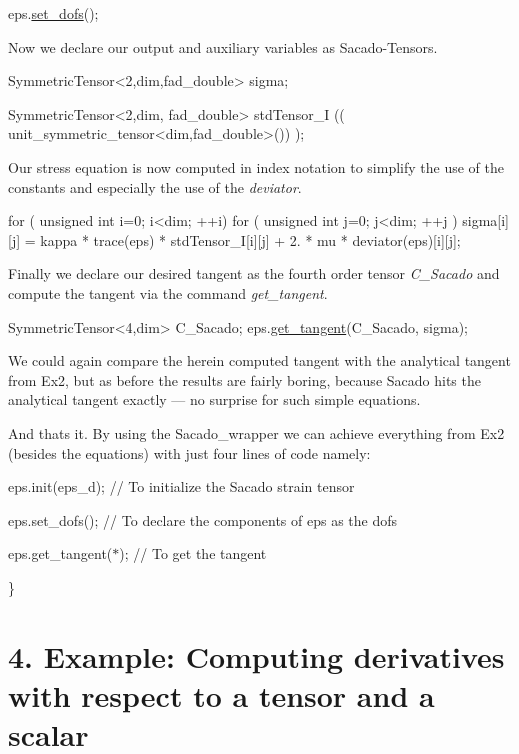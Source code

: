 \begin{DoxyCode}
eps.\hyperlink{classSacado__Wrapper_1_1SymTensor_aa9e0fcc9d4e0a4120bedb8ef9b8d7ecb}{set\_dofs}();
\end{DoxyCode}
 Now we declare our output and auxiliary variables as Sacado-\/\+Tensors. 
\begin{DoxyCode}
SymmetricTensor<2,dim,fad\_double> sigma;

SymmetricTensor<2,dim, fad\_double> stdTensor\_I (( unit\_symmetric\_tensor<dim,fad\_double>()) );
\end{DoxyCode}
 Our stress equation is now computed in index notation to simplify the use of the constants and especially the use of the {\itshape deviator}. 
\begin{DoxyCode}
\textcolor{keywordflow}{for} ( \textcolor{keywordtype}{unsigned} \textcolor{keywordtype}{int} i=0; i<dim; ++i)
  \textcolor{keywordflow}{for} ( \textcolor{keywordtype}{unsigned} \textcolor{keywordtype}{int} j=0; j<dim; ++j )
      sigma[i][j] = kappa * trace(eps) *  stdTensor\_I[i][j] + 2. * mu * deviator(eps)[i][j];
\end{DoxyCode}
 Finally we declare our desired tangent as the fourth order tensor {\itshape C\+\_\+\+Sacado} and compute the tangent via the command {\itshape get\+\_\+tangent}. 
\begin{DoxyCode}
SymmetricTensor<4,dim> C\_Sacado;
eps.\hyperlink{classSacado__Wrapper_1_1SymTensor_ab97427c3b5cab279e58607cf431ab262}{get\_tangent}(C\_Sacado, sigma);
\end{DoxyCode}
 We could again compare the herein computed tangent with the analytical tangent from Ex2, but as before the results are fairly boring, because Sacado hits the analytical tangent exactly --- no surprise for such simple equations.

And that\textquotesingle{}s it. By using the Sacado\+\_\+wrapper we can achieve everything from Ex2 (besides the equations) with just four lines of code namely\+:
\begin{DoxyItemize}
\item eps.\+init(eps\+\_\+d); // To initialize the Sacado strain tensor
\item eps.\+set\+\_\+dofs(); // To declare the components of eps as the dofs
\item eps.\+get\+\_\+tangent($\ast$); // To get the tangent 
\begin{DoxyCode}
\}
\end{DoxyCode}
 
\end{DoxyItemize}\hypertarget{index_Ex4}{}\section{4. Example\+: Computing derivatives with respect to a tensor and a scalar}\label{index_Ex4}

